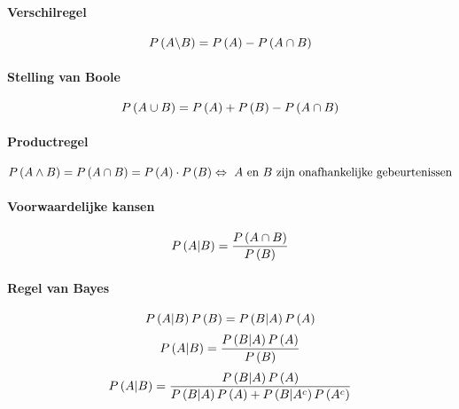 \paragraph{Verschilregel}
\label{sec:VerschilregelKangsrekening}
\[
  P\left(A \backslash B\right) = P\left(A\right) - P\left(A \cap B\right)
\]

\paragraph{Stelling van Boole}
\label{sec:StellingBooleKangsrekening}
\[
  P\left(A \cup B\right) = P\left(A\right) + P\left(B\right) - P\left(A \cap B\right)
\]

\paragraph{Productregel}
\label{sec:ProductregelKangsrekening}
\[
  P\left(A \wedge B\right) = P\left(A \cap B\right) = P\left(A\right) \cdot P\left(B\right)
  \Leftrightarrow
  \mbox{ $A$ en $B$ zijn onafhankelijke gebeurtenissen}
\]

\paragraph{Voorwaardelijke kansen}
\[
  P\left(A | B\right) = \frac{P\left(A \cap B\right)}{P\left(B\right)}
\]

\paragraph{Regel van Bayes}
\[
  P\left(A|B\right)P\left(B\right) = P\left(B|A\right)P\left(A\right)
\]
\[
  P\left(A|B\right) = \frac{P\left(B|A\right)P\left(A\right)}{P\left(B\right)}
\]
\[
  P\left(A|B\right) = \frac{P\left(B|A\right)P\left(A\right)}{P\left(B|A\right)P\left(A\right) + P\left(B|A^c\right)P\left(A^c\right)}
\]